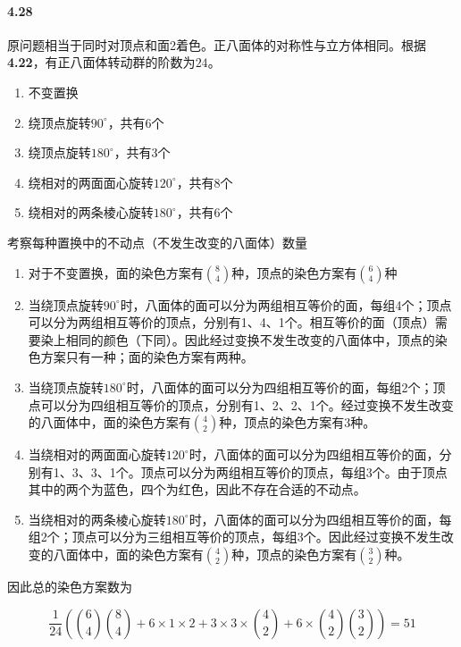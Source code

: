 \documentclass{../notes}
\begin{document}
    \paragraph*{4.28} 原问题相当于同时对顶点和面2着色。正八面体的对称性与立方体相同。根据\textbf{4.22}，有正八面体转动群的阶数为$24$。

    \begin{enumerate}
        \item 不变置换
        \item 绕顶点旋转$90^\circ$，共有6个
        \item 绕顶点旋转$180^\circ$，共有3个
        \item 绕相对的两面面心旋转$120^\circ$，共有8个
        \item 绕相对的两条棱心旋转$180^\circ$，共有6个
    \end{enumerate}

    考察每种置换中的不动点（不发生改变的八面体）数量

    \begin{enumerate}
        \item 对于不变置换，面的染色方案有$\binom{8}{4}$种，顶点的染色方案有$\binom{6}{4}$种
        \item 当绕顶点旋转$90^\circ$时，八面体的面可以分为两组相互等价的面，每组4个；顶点可以分为两组相互等价的顶点，分别有1、4、1个。相互等价的面（顶点）需要染上相同的颜色（下同）。因此经过变换不发生改变的八面体中，顶点的染色方案只有一种；面的染色方案有两种。
        \item 当绕顶点旋转$180^\circ$时，八面体的面可以分为四组相互等价的面，每组2个；顶点可以分为四组相互等价的顶点，分别有1、2、2、1个。经过变换不发生改变的八面体中，面的染色方案有$\binom{4}{2}$种，顶点的染色方案有$3$种。
        \item 当绕相对的两面面心旋转$120^\circ$时，八面体的面可以分为四组相互等价的面，分别有1、3、3、1个。顶点可以分为两组相互等价的顶点，每组3个。由于顶点其中的两个为蓝色，四个为红色，因此不存在合适的不动点。
        \item 当绕相对的两条棱心旋转$180^\circ$时，八面体的面可以分为四组相互等价的面，每组2个；顶点可以分为三组相互等价的顶点，每组3个。因此经过变换不发生改变的八面体中，面的染色方案有$\binom{4}{2}$种，顶点的染色方案有$\binom{3}{2}$种。
    \end{enumerate}

    因此总的染色方案数为

    \begin{equation}
        \frac{1}{24}\left(\binom{6}{4}\binom{8}{4} + 6\times 1\times 2 + 3\times 3\times \binom{4}{2} + 6\times \binom{4}{2}\binom{3}{2}\right) = 51
    \end{equation}
\end{document}
